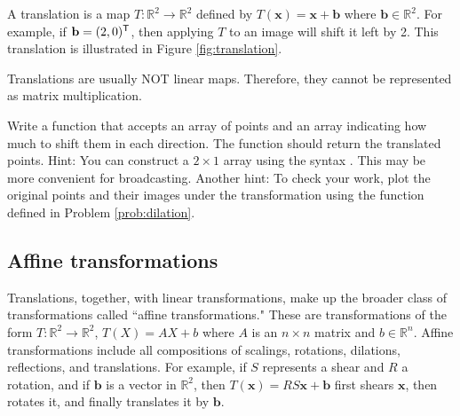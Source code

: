 A translation is a map $T: \mathbb{R}^2 \rightarrow \mathbb{R}^2$ defined by $T(\mathbf{x}) = \mathbf{x}+\mathbf{b}$ where $\mathbf{b} \in \mathbb{R}^2$. 
For example, if $\mathbf{b} = (2, 0)^{\mathsf T}$, then applying $T$ to an image will shift it left by 2. 
This translation is illustrated in Figure \ref{fig:translation}.


Translations are usually NOT linear maps. 
Therefore, they cannot be represented as matrix multiplication.

\begin{problem}
Write a function that accepts an array of points and an array indicating how much to shift them in each direction. 
The function should return the translated points. 
Hint: You can construct a $2 \times 1$ array using the syntax . 
This may be more convenient for broadcasting. 
Another hint: To check your work, plot the original points and their images under the transformation using the function  defined in Problem \ref{prob:dilation}.
\end{problem}

\subsection*{Affine transformations}
Translations, together, with linear transformations, make up the broader class of transformations called ``affine transformations." 
These are transformations of the form $T: \mathbb{R}^2 \to \mathbb{R}^2$, $T(X) = AX + b$ where $A$ is an $n\times n$ matrix and $b \in \mathbb{R}^n$. 
Affine transformations include all compositions of scalings, rotations, dilations, reflections, and translations. 
For example, if $S$ represents a shear and $R$ a rotation, and if $\mathbf{b}$ is a vector in $\mathbb{R}^2$, then $T(\mathbf{x}) = RS\mathbf{x} + \mathbf{b}$ first shears $\mathbf{x}$, then rotates it, and finally translates it by $\mathbf{b}$. 


